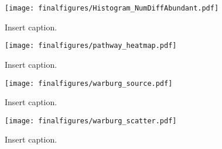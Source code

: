 \documentclass[10pt]{article}
\begin{document}
\begin{figure}[ht!]
  \centering
     \texttt{[image: finalfigures/Histogram\_NumDiffAbundant.pdf]}
  \caption{Insert caption.}
     \label{fig:SIFig_HistogramDiffAbundance}
\end{figure}
 

\begin{figure}[ht!]
  \centering
     \texttt{[image: finalfigures/pathway\_heatmap.pdf]}
  \caption{Insert caption.}
     \label{fig:SIFig_PathwayHeatmap}
\end{figure}

\begin{figure}[ht!]
  \centering
     \texttt{[image: finalfigures/warburg\_source.pdf]}
  \caption{Insert caption.}
     \label{fig:SIFig_WarburgSource}
\end{figure}

\begin{figure}[ht!]
  \centering
     \texttt{[image: finalfigures/warburg\_scatter.pdf]}
  \caption{Insert caption.}
     \label{fig:SIFig_WarburgScatter}
\end{figure}

 
\end{document}
